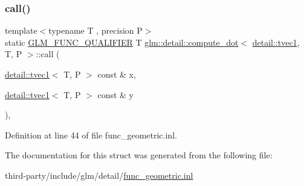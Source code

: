 \subsubsection{\texorpdfstring{call()}{call()}}
{\footnotesize\ttfamily template$<$typename T , precision P$>$ \\
static \hyperlink{setup_8hpp_a33fdea6f91c5f834105f7415e2a64407}{G\+L\+M\+\_\+\+F\+U\+N\+C\+\_\+\+Q\+U\+A\+L\+I\+F\+I\+ER} T \hyperlink{structglm_1_1detail_1_1compute__dot}{glm\+::detail\+::compute\+\_\+dot}$<$ \hyperlink{structglm_1_1detail_1_1tvec1}{detail\+::tvec1}, T, P $>$\+::call (\begin{DoxyParamCaption}\item[{\hyperlink{structglm_1_1detail_1_1tvec1}{detail\+::tvec1}$<$ T, P $>$ const \&}]{x,  }\item[{\hyperlink{structglm_1_1detail_1_1tvec1}{detail\+::tvec1}$<$ T, P $>$ const \&}]{y }\end{DoxyParamCaption})\hspace{0.3cm}{\ttfamily [inline]}, {\ttfamily [static]}}



Definition at line 44 of file func\+\_\+geometric.\+inl.



The documentation for this struct was generated from the following file\+:\begin{DoxyCompactItemize}
\item 
third-\/party/include/glm/detail/\hyperlink{func__geometric_8inl}{func\+\_\+geometric.\+inl}\end{DoxyCompactItemize}
